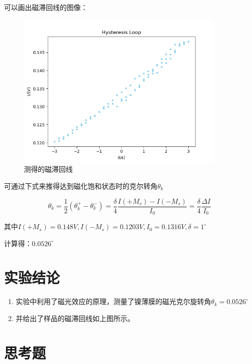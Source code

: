 \documentclass[a4paper,UTF8]{ctexart}
\begin{document}
可以画出磁滞回线的图像：

\begin{figure}[H]
    \centering
    \begin{minipage}[b]{0.9\textwidth}
        \centering
        \includegraphics[width=0.9\textwidth]{./1.png}
        \caption{测得的磁滞回线}
    \end{minipage}
\end{figure}

可通过下式来推得达到磁化饱和状态时的克尔转角$\theta_k$

\begin{equation}
\theta_k=\frac{1}{2}\left(\theta_k^{+}-\theta_k^{-}\right)=\frac{\delta}{4} \frac{I\left(+M_s\right)-I\left(-M_s\right)}{I_0}=\frac{\delta}{4} \frac{\Delta I}{I_0}
\end{equation}

其中$I(+M_s) = 0.148V, I(-M_s) = 0.1203V, I_0 = 0.1316V, \delta = 1^{\circ}$

计算得：$0.0526^{\circ}$

\section{实验结论}

\begin{enumerate}
    \item 实验中利用了磁光效应的原理，测量了镍薄膜的磁光克尔旋转角$\theta_k = 0.0526^{\circ}$
    \item 并给出了样品的磁滞回线如上图所示。
\end{enumerate}

\section{思考题}
\end{document}

